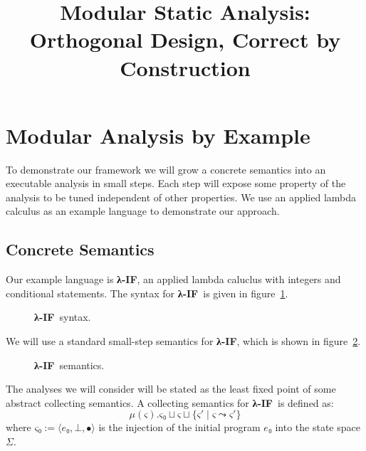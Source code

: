 \documentclass[pldi]{sigplanconf}
\makeatletter
\newcommand{\lamif}{\textbf{λ-IF}\@}
\newcommand{\steps}{\leadsto}
\newcommand{\st}{\;|\;}
\makeatother
\begin{document}
\title{Modular Static Analysis: Orthogonal Design, Correct by Construction}
\maketitle




\section{Modular Analysis by Example}

To demonstrate our framework we will grow a concrete semantics into an executable analysis in small steps.
Each step will expose some property of the analysis to be tuned independent of other properties.
We use an applied lambda calculus as an example language to demonstrate our approach.


\subsection{Concrete Semantics}

Our example language is \lamif, an applied lambda caluclus with integers and conditional statements.
The syntax for \lamif\ is given in figure~\ref{lamif:syntax}.

\begin{figure}[t]
\caption{\lamif\ syntax.}
\label{lamif:syntax}

\end{figure}

We will use a standard small-step semantics for \lamif, which is shown in figure~\ref{lamif:semantics}.

\begin{figure}[t]
\caption{\lamif\ semantics.}
\label{lamif:semantics}
{\scriptsize


}
\end{figure}

The analyses we will consider will be stated as the least fixed point of some abstract collecting semantics.
A collecting semantics for \lamif\ is defined as:
\begin{equation*}
  μ(ς). ς₀ ⊔ ς ⊔ \{ ς' \st ς \steps ς' \}
\end{equation*}
where $ς₀ := ⟨ e₀ , ⊥ , ∙ ⟩$ is the injection of the initial program $e₀$ into the state space $Σ$.
\end{document}
